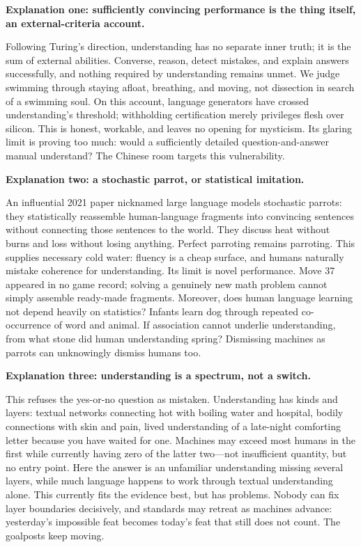 \textbf{Explanation one: sufficiently convincing performance is the thing itself, an external-criteria account.}

Following Turing's direction, understanding has no separate inner truth; it is the sum of external abilities. Converse, reason, detect mistakes, and explain answers successfully, and nothing required by understanding remains unmet. We judge swimming through staying afloat, breathing, and moving, not dissection in search of a swimming soul. On this account, language generators have crossed understanding's threshold; withholding certification merely privileges flesh over silicon. This is honest, workable, and leaves no opening for mysticism. Its glaring limit is proving too much: would a sufficiently detailed question-and-answer manual understand? The Chinese room targets this vulnerability.

\textbf{Explanation two: a stochastic parrot, or statistical imitation.}

An influential 2021 paper nicknamed large language models stochastic parrots: they statistically reassemble human-language fragments into convincing sentences without connecting those sentences to the world. They discuss heat without burns and loss without losing anything. Perfect parroting remains parroting. This supplies necessary cold water: fluency is a cheap surface, and humans naturally mistake coherence for understanding. Its limit is novel performance. Move 37 appeared in no game record; solving a genuinely new math problem cannot simply assemble ready-made fragments. Moreover, does human language learning not depend heavily on statistics? Infants learn dog through repeated co-occurrence of word and animal. If association cannot underlie understanding, from what stone did human understanding spring? Dismissing machines as parrots can unknowingly dismiss humans too.

\textbf{Explanation three: understanding is a spectrum, not a switch.}

This refuses the yes-or-no question as mistaken. Understanding has kinds and layers: textual networks connecting hot with boiling water and hospital, bodily connections with skin and pain, lived understanding of a late-night comforting letter because you have waited for one. Machines may exceed most humans in the first while currently having zero of the latter two---not insufficient quantity, but no entry point. Here the answer is an unfamiliar understanding missing several layers, while much language happens to work through textual understanding alone. This currently fits the evidence best, but has problems. Nobody can fix layer boundaries decisively, and standards may retreat as machines advance: yesterday's impossible feat becomes today's feat that still does not count. The goalposts keep moving.

